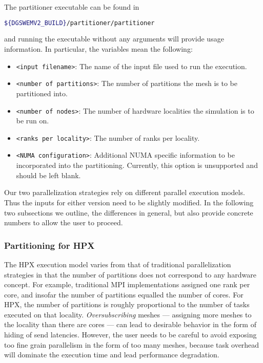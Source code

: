 The partitioner executable can be found in
\begin{lstlisting}[language=bash]
${DGSWEMV2_BUILD}/partitioner/partitioner
\end{lstlisting}
and running the executable without any arguments will provide usage information. In particular, the variables mean the following:
\begin{itemize}
\item \lstinline{<input filename>}: The name of the input file used to run the execution.
\item \lstinline{<number of partitions>}: The number of partitions the mesh is to be partitioned into.
\item \lstinline{<number of nodes>}: The number of hardware localities the simulation is to be run on.
\item \lstinline{<ranks per locality>}: The number of ranks per locality. 
\item \lstinline{<NUMA configuration>}: Additional NUMA specific information to be incorporated into the partitioning. Currently, this option is unsupported and should be left blank.
\end{itemize}
Our two parallelization strategies rely on different parallel execution models. Thus the inputs for either version need to be slightly modified. In the following two subsections we outline, the differences in general, but also provide concrete numbers to allow the user to proceed.
\subsubsection{Partitioning for HPX}
The HPX execution model varies from that of traditional parallelization strategies in that the number of partitions does not correspond to any hardware concept. For example, traditional MPI implementations assigned one rank per core, and insofar the number of partitions equalled the number of cores. For HPX, the number of partitions is roughly proportional to the number of tasks executed on that locality. \emph{Oversubscribing} meshes --- assigning more meshes to the locality than there are cores --- can lead to desirable behavior in the form of hiding of send latencies. However, the user needs to be careful to avoid exposing too fine grain parallelism in the form of too many meshes, because task overhead will dominate the execution time and lead performance degradation.

